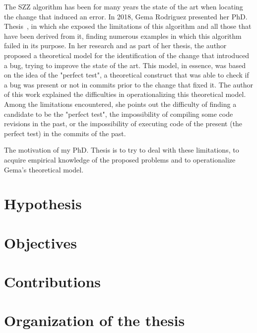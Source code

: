 The SZZ algorithm has been for many years the state of the art when locating the change that induced an error. 
In 2018, Gema Rodriguez presented her PhD. Thesis~\cite{rodriguez2018towards}, in which she exposed the limitations of this algorithm and all those that have been derived from it, finding numerous examples in which this algorithm failed in its purpose. 
In her research and as part of her thesis, the author proposed a theoretical model for the identification of the change that introduced a bug, trying to improve the state of the art. 
This model, in essence, was based on the idea of the "perfect test", a theoretical construct that was able to check if a bug was present or not in commits prior to the change that fixed it. The author of this work explained the difficulties in operationalizing this theoretical model. 
Among the limitations encountered, she points out the difficulty of finding a candidate to be the "perfect test", the impossibility of compiling some code revisions in the past, or the impossibility of executing code of the present (the perfect test) in the commits of the past.

The motivation of my PhD. Thesis is to try to deal with these limitations, to acquire empirical knowledge of the proposed problems and to operationalize Gema's theoretical model.

\section{Hypothesis}

\section{Objectives}

\section{Contributions}

\section{Organization of the thesis}